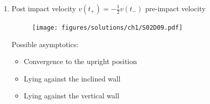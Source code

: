 \begin{solution}[1.1]
\begin{enumerate}
\begin{enumerate}
\item Post impact velocity $ v(t_+) = -\frac{1}{2}v(t_-) $ pre-impact velocity
\begin{figure}[h]
	\centering
	\texttt{[image: figures/solutions/ch1/S02D09.pdf]}
\end{figure}
Possible asymptotics:
\begin{itemize}
	\item Convergence to the upright position
	\item Lying against the inclined wall
	\item Lying against the vertical wall
\end{itemize}
\end{enumerate}

\end{enumerate}
\end{solution}


